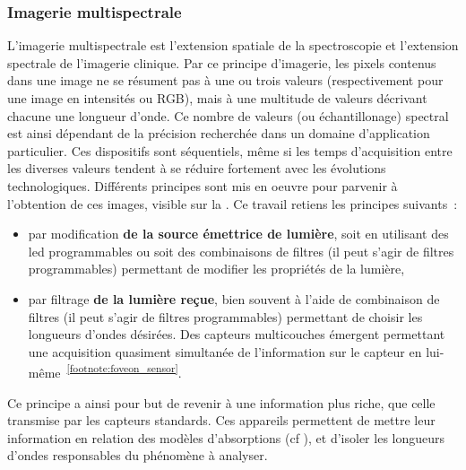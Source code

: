 \subsubsection{Imagerie multispectrale}
L'imagerie multispectrale est l'extension spatiale de la spectroscopie et l'extension spectrale de l'imagerie clinique. Par ce principe d'imagerie, les pixels contenus dans une image ne se résument pas à une ou trois valeurs (respectivement pour une image en intensités ou RGB), mais à une multitude de valeurs décrivant chacune une longueur d'onde. Ce nombre de valeurs (ou échantillonage) spectral est ainsi dépendant de la précision recherchée dans un domaine d'application particulier. Ces dispositifs sont séquentiels, même si les temps d'acquisition entre les diverses valeurs tendent à se réduire fortement avec les évolutions technologiques. Différents principes sont mis en oeuvre pour parvenir à l'obtention de ces images, visible sur la . Ce travail retiens les principes suivants~:
\begin{itemize}
\item par modification \textbf{de la source émettrice de lumière}, soit en utilisant des \gls{led} programmables ou soit des combinaisons de filtres (il peut s'agir de filtres programmables) permettant de modifier les propriétés de la lumière,
\item par filtrage \textbf{de la lumière reçue}, bien souvent à l'aide de combinaison de filtres (il peut s'agir de filtres programmables) permettant de choisir les longueurs d'ondes désirées. Des capteurs multicouches émergent permettant une acquisition quasiment simultanée de l'information sur le capteur en lui-même~\textsuperscript{\ref{footnote:foveon_sensor}}.
\end{itemize}\par

Ce principe a ainsi pour but de revenir à une information plus riche, que celle transmise par les capteurs standards. Ces appareils permettent de mettre leur information en relation des modèles d'absorptions (cf ), et d'isoler les longueurs d'ondes responsables du phénomène à analyser.\par 

\addtocounter{footnote}{1}

